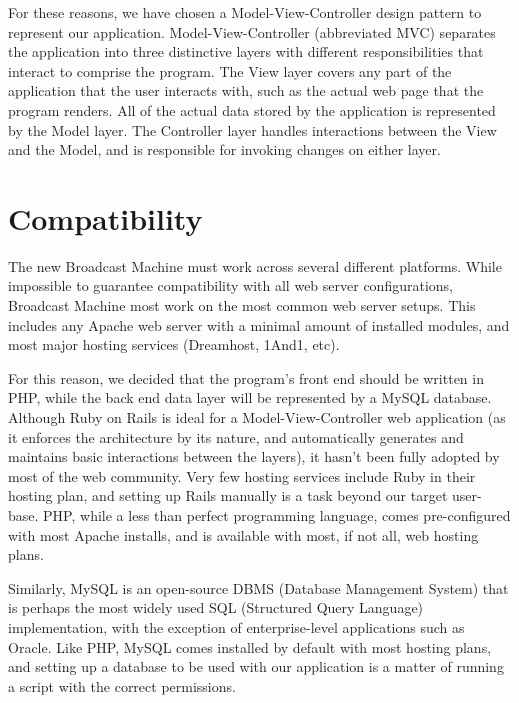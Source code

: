 \documentclass[a4paper,12pt]{report}
\begin{document}
For these reasons, we have chosen a Model-View-Controller design pattern to represent our application. 
Model-View-Controller (abbreviated MVC) separates the application into three distinctive layers with different responsibilities that interact to comprise the program. 
The View layer covers any part of the application that the user interacts with, such as the actual web page that the program renders. 
All of the actual data stored by the application is represented by the Model layer. 
The Controller layer handles interactions between the View and the Model, and is responsible for invoking changes on either layer.

\section{Compatibility}

The new Broadcast Machine must work across several different platforms. 
While impossible to guarantee compatibility with all web server configurations, Broadcast Machine most work on the most common web server setups. 
This includes any Apache web server with a minimal amount of installed modules, and most major hosting services (Dreamhost, 1And1, etc). 

For this reason, we decided that the program’s front end should be written in PHP, while the back end data layer will be represented by a MySQL database. Although Ruby on Rails is ideal for a Model-View-Controller web application (as it enforces the architecture by its nature, and automatically generates and maintains basic interactions between the layers), it hasn’t been fully adopted by most of the web community. 
Very few hosting services include Ruby in their hosting plan, and setting up Rails manually is a task beyond our target user-base. 
PHP, while a less than perfect programming language, comes pre-configured with most Apache installs, and is available with most, if not all, web hosting plans. 

Similarly, MySQL is an open-source DBMS (Database Management System) that is perhaps the most widely used SQL (Structured Query Language) implementation, with the exception of enterprise-level applications such as Oracle. 
Like PHP, MySQL comes installed by default with most hosting plans, and setting up a database to be used with our application is a matter of running a script with the correct permissions. 
\end{document}
